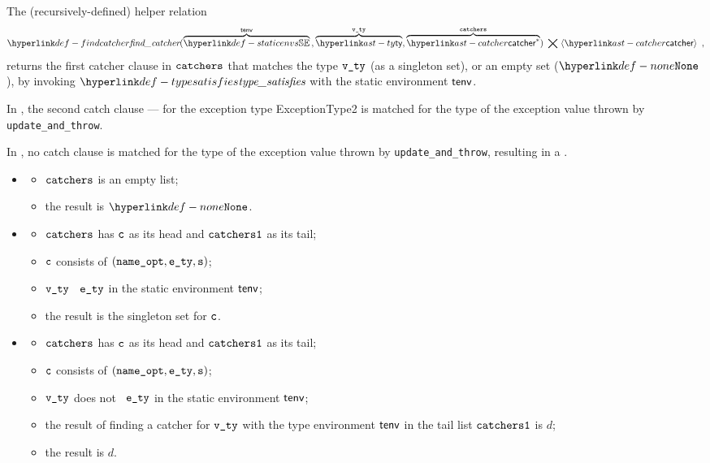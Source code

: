 \hypertarget{def-findcatcher}{}
The (recursively-defined) helper relation
\[
  \findcatcher(\overname{\staticenvs}{\tenv} \aslsep \overname{\ty}{\vvty}, \overname{\catcher^*}{\catchers})
  \;\aslrel\; \langle \catcher \rangle \enspace,
\]
returns the first catcher clause in $\texttt{catchers}$ that matches the type $\texttt{v\_ty}$ (as a singleton set), or an empty set ($\None$),
by invoking $\typesat$ with the static environment $\textsf{tenv}$.

In , the second catch clause --- for the exception type ExceptionType2
is matched for the type of the exception value thrown by \verb|update_and_throw|.

In , no catch clause is matched for the type of the exception value thrown by \verb|update_and_throw|,
resulting in a \dynamicerrorterm{}.

\ProseParagraph
\OneApplies
\begin{itemize}
  \item {}
  \begin{itemize}
    \item $\texttt{catchers}$ is an empty list;
    \item the result is $\None$.
  \end{itemize}

  \item {}
  \begin{itemize}
    \item $\texttt{catchers}$ has $\texttt{c}$ as its head and $\texttt{catchers1}$ as its tail;
    \item $\texttt{c}$ consists of $(\texttt{name\_opt}, \texttt{e\_ty}, \texttt{s})$;
    \item $\texttt{v\_ty}$ \subtypesterm\ $\texttt{e\_ty}$ in the static environment $\textsf{tenv}$;
    \item the result is the singleton set for $\texttt{c}$.
  \end{itemize}

  \item {}
  \begin{itemize}
    \item $\texttt{catchers}$ has $\texttt{c}$ as its head and $\texttt{catchers1}$ as its tail;
    \item $\texttt{c}$ consists of $(\texttt{name\_opt}, \texttt{e\_ty}, \texttt{s})$;
    \item $\texttt{v\_ty}$ does not \subtypeterm\ $\texttt{e\_ty}$ in the static environment $\textsf{tenv}$;
    \item the result of finding a catcher for $\texttt{v\_ty}$ with the type environment $\textsf{tenv}$ in the tail list $\texttt{catchers1}$
    is $d$;
    \item the result is $d$.
  \end{itemize}
\end{itemize}

